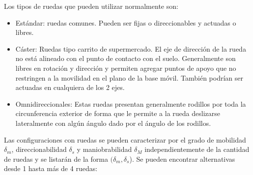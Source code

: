 Los tipos de ruedas que pueden utilizar normalmente son:
\begin{itemize}
	\item Estándar: ruedas comunes. Pueden ser fijas o direccionables y actuadas o libres.
	\item Cáster: Ruedas tipo carrito de supermercado. El eje de dirección de la rueda no está alineado con el punto de contacto con el suelo. Generalmente son libres en rotación y dirección y permiten agregar puntos de apoyo que no restringen a la movilidad en el plano de la base móvil. También podrían ser actuadas en cualquiera de los 2 ejes.
	\item Omnidireccionales: Estas ruedas presentan generalmente rodillos por toda la circunferencia exterior de forma que le permite a la rueda deslizarse lateralmente con algún ángulo dado por el ángulo de los rodillos.  
\end{itemize}
Las configuraciones con ruedas se pueden caracterizar por el grado de mobilidad $\delta_m$, direccionabilidad $\delta_s$ y maniobrabilidad $\delta_M$ \cite{de_wit_theory_1996} independientemente de la cantidad de ruedas y se listarán de la forma $(\delta_m, \delta_s$). Se pueden encontrar alternativas desde 1 hasta más de 4 ruedas:
